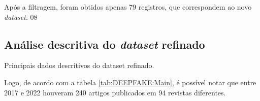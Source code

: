 Após a filtragem, foram obtidos apenas 79 registros, que correspondem ao novo \textit{dataset}.
08
\subsection{Análise descritiva do \textit{dataset} refinado}

\begin{table}[]
    \centering
{}
    \caption{Principais dados descritivos do dataset refinado.}
    \label{tab:DEEPFAKE:Main}
\end{table}

Logo, de acordo com a tabela \ref{tab:DEEPFAKE:Main}, é possível notar que entre 2017 e 2022 houveram 240 artigos publicados em 94 revistas diferentes.
